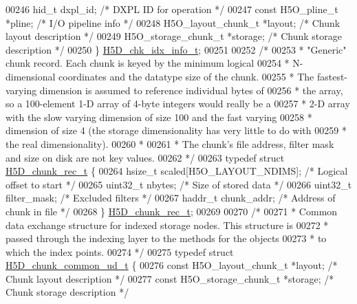 \begin{DoxyCode}
00246     hid\_t dxpl\_id;              \textcolor{comment}{/* DXPL ID for operation */}
00247     \textcolor{keyword}{const} H5O\_pline\_t *pline;   \textcolor{comment}{/* I/O pipeline info */}
00248     H5O\_layout\_chunk\_t *layout;           \textcolor{comment}{/* Chunk layout description */}
00249     H5O\_storage\_chunk\_t *storage;         \textcolor{comment}{/* Chunk storage description */}
00250 \} \hyperlink{struct_h5_d__chk__idx__info__t}{H5D\_chk\_idx\_info\_t};
00251 
00252 \textcolor{comment}{/*}
00253 \textcolor{comment}{ * "Generic" chunk record.  Each chunk is keyed by the minimum logical}
00254 \textcolor{comment}{ * N-dimensional coordinates and the datatype size of the chunk.}
00255 \textcolor{comment}{ * The fastest-varying dimension is assumed to reference individual bytes of}
00256 \textcolor{comment}{ * the array, so a 100-element 1-D array of 4-byte integers would really be a}
00257 \textcolor{comment}{ * 2-D array with the slow varying dimension of size 100 and the fast varying}
00258 \textcolor{comment}{ * dimension of size 4 (the storage dimensionality has very little to do with}
00259 \textcolor{comment}{ * the real dimensionality).}
00260 \textcolor{comment}{ *}
00261 \textcolor{comment}{ * The chunk's file address, filter mask and size on disk are not key values.}
00262 \textcolor{comment}{ */}
00263 \textcolor{keyword}{typedef} \textcolor{keyword}{struct }\hyperlink{struct_h5_d__chunk__rec__t}{H5D\_chunk\_rec\_t} \{
00264     hsize\_t scaled[H5O\_LAYOUT\_NDIMS];   \textcolor{comment}{/* Logical offset to start */}
00265     uint32\_t    nbytes;             \textcolor{comment}{/* Size of stored data  */}
00266     uint32\_t    filter\_mask;            \textcolor{comment}{/* Excluded filters */}
00267     haddr\_t     chunk\_addr;                     \textcolor{comment}{/* Address of chunk in file */}
00268 \} \hyperlink{struct_h5_d__chunk__rec__t}{H5D\_chunk\_rec\_t};
00269 
00270 \textcolor{comment}{/*}
00271 \textcolor{comment}{ * Common data exchange structure for indexed storage nodes.  This structure is}
00272 \textcolor{comment}{ * passed through the indexing layer to the methods for the objects}
00273 \textcolor{comment}{ * to which the index points.}
00274 \textcolor{comment}{ */}
00275 \textcolor{keyword}{typedef} \textcolor{keyword}{struct }\hyperlink{struct_h5_d__chunk__common__ud__t}{H5D\_chunk\_common\_ud\_t} \{
00276     \textcolor{keyword}{const} H5O\_layout\_chunk\_t *layout;           \textcolor{comment}{/* Chunk layout description */}
00277     \textcolor{keyword}{const} H5O\_storage\_chunk\_t *storage;         \textcolor{comment}{/* Chunk storage description */}

\end{DoxyCode}
